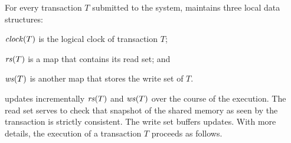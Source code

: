 For every transaction $T$ submitted to the system,  maintains three local data structures:
\begin{inparaenumorig}[]
\item $\clockOf{T}$ is the logical clock of transaction $T$;
\item $\readSetOf{T}$ is a map that contains its read set; and 
\item $\writeSetOf{T}$ is another map that stores the write set of $T$.
\end{inparaenumorig}
 updates incrementally $\readSetOf{T}$ and $\writeSetOf{T}$ over the course of the execution.
The read set serves to check that snapshot of the shared memory as seen by the transaction is strictly consistent.
The write set buffers updates.
With more details, the execution of a transaction $T$ proceeds as follows.

